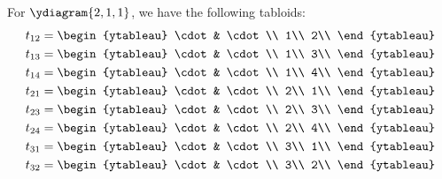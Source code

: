 \documentclass[]{article}
\begin{document}
For $\ydiagram{2, 1, 1}$, we have the following tabloids:
\begin{align*}
	t_{12} &= \begin{ytableau}
	\cdot & \cdot\\
	1\\
	2\\
	\end{ytableau}\\
	t_{13} &= \begin{ytableau}
	\cdot & \cdot\\
	1\\
	3\\
\end{ytableau}\\
	t_{14} &= \begin{ytableau}
	\cdot & \cdot\\
	1\\
	4\\
\end{ytableau}\\
	t_{21} &= \begin{ytableau}
	\cdot & \cdot\\
	2\\
	1\\
\end{ytableau}\\
	t_{23} &= \begin{ytableau}
	\cdot & \cdot\\
	2\\
	3\\
\end{ytableau}\\
	t_{24} &= \begin{ytableau}
	\cdot & \cdot\\
	2\\
	4\\
\end{ytableau}\\
	t_{31} &= \begin{ytableau}
	\cdot & \cdot\\
	3\\
	1\\
\end{ytableau}\\
	t_{32} &= \begin{ytableau}
	\cdot & \cdot\\
	3\\
	2\\
\end{ytableau}\\

\end{align*}
\end{document}
